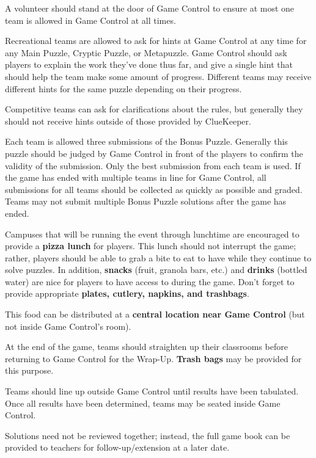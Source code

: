 A volunteer should stand at the door of Game Control to ensure at most
one team is allowed in Game Control at all times. 

Recreational teams are allowed to ask for hints at Game Control at any time
for any Main Puzzle, Cryptic Puzzle, or Metapuzzle. Game Control should ask
players to explain the work they've
done thus far, and give a single hint that should help the team make some
amount of progress. Different teams may receive different hints for the same
puzzle depending on their progress.

Competitive teams can ask for clarifications about the rules, but generally
they should not receive hints outside of those provided by ClueKeeper.

Each team is allowed three submissions of the Bonus Puzzle. Generally this
puzzle should be judged by Game Control in front of the players to confirm
the validity of the submission. 
Only the best submission from each team is used. If the game has ended
with multiple teams in line for Game Control, all submissions for all teams
should be collected as quickly as possible and graded. Teams may not submit
multiple Bonus Puzzle solutions after the game has ended.


Campuses that will be running the event through lunchtime are encouraged to
provide a \textbf{pizza lunch} for players. This lunch should not interrupt the
game; rather, players should be able to grab a bite to eat to have while they
continue to solve puzzles. In addition, \textbf{snacks}
(fruit, granola bars, etc.) and \textbf{drinks} (bottled water) are nice for
players to have access to during the game. Don't forget to provide
appropriate \textbf{plates, cutlery, napkins, and trashbags}.

This food can be distributed at a \textbf{central location near Game Control}
(but not inside Game Control's room).


At the end of the game, teams should straighten up their classrooms before
returning to Game Control for the Wrap-Up. \textbf{Trash bags} may be
provided for this purpose.

Teams should line up outside Game Control until results have been tabulated.
Once all results have been determined, teams may be seated inside Game Control.

Solutions need not be reviewed together; instead, the full game book can be provided
to teachers for follow-up/extension at a later date.

